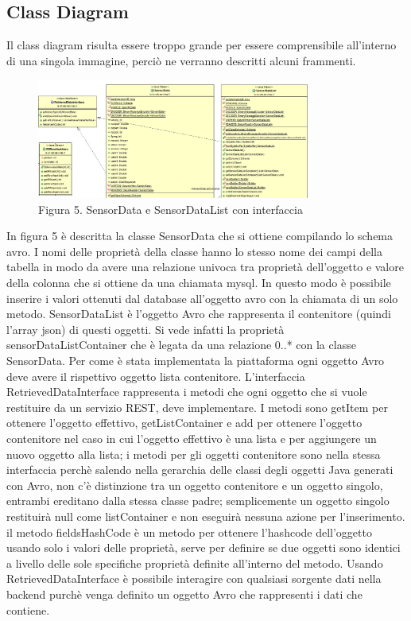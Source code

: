 \subsection{Class Diagram}
Il class diagram risulta essere troppo grande per essere comprensibile all’interno di una singola immagine, perciò ne verranno descritti alcuni frammenti. \par
\begin{figure}[h]
	\centering
	\includegraphics[width=0.8\textwidth]{sensor-data.png}
	\caption*{Figura 5. SensorData e SensorDataList con interfaccia}
\end{figure}
In figura 5 è descritta la classe SensorData che si ottiene compilando lo schema avro. I nomi delle proprietà della classe hanno lo stesso nome dei campi della tabella in modo da avere una relazione univoca tra proprietà dell’oggetto e valore della colonna che si ottiene da una chiamata mysql. In questo modo è possibile inserire i valori ottenuti dal database all’oggetto avro con la chiamata di un solo metodo. SensorDataList è l’oggetto Avro che rappresenta il contenitore (quindi l’array json) di questi oggetti. Si vede infatti la proprietà sensorDataListContainer che è legata da una relazione 0..* con la classe SensorData. Per come è stata implementata la piattaforma ogni oggetto Avro deve avere il rispettivo oggetto lista contenitore. L’interfaccia RetrievedDataInterface rappresenta i metodi che ogni oggetto che si vuole restituire da un servizio REST, deve implementare. I metodi sono getItem per ottenere l’oggetto effettivo, getListContainer e add per ottenere l’oggetto contenitore nel caso in cui l’oggetto effettivo è una lista e per aggiungere un nuovo oggetto alla lista; i metodi per gli oggetti contenitore sono nella stessa interfaccia perchè salendo nella gerarchia delle classi degli oggetti Java generati con Avro, non c’è distinzione tra un oggetto contenitore e un oggetto singolo, entrambi ereditano dalla stessa classe padre; semplicemente un oggetto singolo restituirà null come listContainer e non eseguirà nessuna azione per l'inserimento. il metodo fieldsHashCode è un metodo per ottenere l’hashcode dell’oggetto usando solo i valori delle proprietà, serve per definire se due oggetti sono identici a livello delle sole specifiche proprietà definite all’interno del metodo. Usando RetrievedDataInterface è possibile interagire con qualsiasi sorgente dati nella backend purchè venga definito un oggetto Avro che rappresenti i dati che contiene. 
